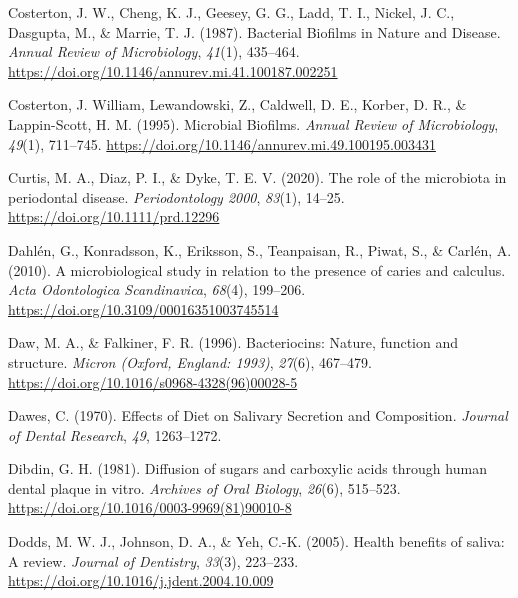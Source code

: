 \documentclass[
  letterpaper,
]{book}
\newlength{\cslhangindent}
\newlength{\cslentryspacingunit} %
\newenvironment{CSLReferences}[2] %
 {%
  \setlength{\parindent}{0pt}
  \ifodd #1
  \let\oldpar\par
  \def\par{\hangindent=\cslhangindent\oldpar}
  \fi
  \setlength{\parskip}{#2\cslentryspacingunit}
 }%
 {}
\begin{document}
\begin{CSLReferences}{1}{0}
\leavevmode{}%
Costerton, J. W., Cheng, K. J., Geesey, G. G., Ladd, T. I., Nickel, J.
C., Dasgupta, M., \& Marrie, T. J. (1987). Bacterial {Biofilms} in
{Nature} and {Disease}. \emph{Annual Review of Microbiology},
\emph{41}(1), 435--464.
\url{https://doi.org/10.1146/annurev.mi.41.100187.002251}

\leavevmode{}%
Costerton, J. William, Lewandowski, Z., Caldwell, D. E., Korber, D. R.,
\& Lappin-Scott, H. M. (1995). Microbial {Biofilms}. \emph{Annual Review
of Microbiology}, \emph{49}(1), 711--745.
\url{https://doi.org/10.1146/annurev.mi.49.100195.003431}

\leavevmode{}%
Curtis, M. A., Diaz, P. I., \& Dyke, T. E. V. (2020). The role of the
microbiota in periodontal disease. \emph{Periodontology 2000},
\emph{83}(1), 14--25. \url{https://doi.org/10.1111/prd.12296}

\leavevmode{}%
Dahlén, G., Konradsson, K., Eriksson, S., Teanpaisan, R., Piwat, S., \&
Carlén, A. (2010). A microbiological study in relation to the presence
of caries and calculus. \emph{Acta Odontologica Scandinavica},
\emph{68}(4), 199--206. \url{https://doi.org/10.3109/00016351003745514}

\leavevmode{}%
Daw, M. A., \& Falkiner, F. R. (1996). Bacteriocins: Nature, function
and structure. \emph{Micron (Oxford, England: 1993)}, \emph{27}(6),
467--479. \url{https://doi.org/10.1016/s0968-4328(96)00028-5}

\leavevmode{}%
Dawes, C. (1970). Effects of {Diet} on {Salivary Secretion} and
{Composition}. \emph{Journal of Dental Research}, \emph{49}, 1263--1272.

\leavevmode{}%
Dibdin, G. H. (1981). Diffusion of sugars and carboxylic acids through
human dental plaque in vitro. \emph{Archives of Oral Biology},
\emph{26}(6), 515--523.
\url{https://doi.org/10.1016/0003-9969(81)90010-8}

\leavevmode{}%
Dodds, M. W. J., Johnson, D. A., \& Yeh, C.-K. (2005). Health benefits
of saliva: A review. \emph{Journal of Dentistry}, \emph{33}(3),
223--233. \url{https://doi.org/10.1016/j.jdent.2004.10.009}


\end{CSLReferences}
\end{document}
